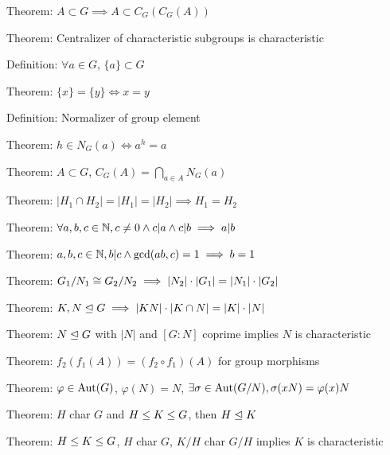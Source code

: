 \LA{}Theorem: $A\subset G\implies A\subset C_{G}(C_{G}(A))$~{\nwtagstyle{}}\RA{}

\LA{}Theorem: Centralizer of characteristic subgroups is characteristic~{\nwtagstyle{}}\RA{}

\LA{}Definition: $\forall a\in G$, $\{a\}\subset G$~{\nwtagstyle{}}\RA{}

\LA{}Theorem: $\{x\}=\{y\}\iff x=y$~{\nwtagstyle{}}\RA{}

\LA{}Definition: Normalizer of group element~{\nwtagstyle{}}\RA{}

\LA{}Theorem: $h\in N_{G}(a)\iff a^{h}=a$~{\nwtagstyle{}}\RA{}

\LA{}Theorem: $A\subset G$, $C_{G}(A) = \bigcap_{a\in A}N_{G}(a)$~{\nwtagstyle{}}\RA{}

\LA{}Theorem: $|H_{1}\cap H_{2}|=|H_{1}|=|H_{2}|\implies H_{1}=H_{2}$~{\nwtagstyle{}}\RA{}

\LA{}Theorem: $\forall a,b,c\in\mathbb{N}, c\neq0\land c|a\land c|b\implies a|b$~{\nwtagstyle{}}\RA{}

\LA{}Theorem: $a,b,c\in\mathbb{N}, b|c\land\gcd(ab,c)=1\implies b=1$~{\nwtagstyle{}}\RA{}

\LA{}Theorem: $G_{1}/N_{1}\cong G_{2}/N_{2}\implies |N_{2}|\cdot|G_{1}|=|N_{1}|\cdot|G_{2}|$~{\nwtagstyle{}}\RA{}

\LA{}Theorem: $K,N\trianglelefteq G\implies |KN|\cdot|K\cap N|=|K|\cdot|N|$~{\nwtagstyle{}}\RA{}

\LA{}Theorem: $N\trianglelefteq G$ with $|N|$ and $[G:N]$ coprime implies $N$ is characteristic~{\nwtagstyle{}}\RA{}

\LA{}Theorem: $f_{2}(f_{1}(A))=(f_{2}\circ f_{1})(A)$ for group morphisms~{\nwtagstyle{}}\RA{}

\LA{}Theorem: $\varphi\in\operatorname{Aut}(G)$, $\varphi(N)=N$, $\exists\sigma\in\operatorname{Aut}(G/N),\sigma(xN)=\varphi(x)N$~{\nwtagstyle{}}\RA{}

\LA{}Theorem: $H$ char $G$ and $H\leq K\leq G$, then $H\trianglelefteq K$~{\nwtagstyle{}}\RA{}

\LA{}Theorem: $H\leq K\leq G$, $H$ char $G$, $K/H$ char $G/H$ implies $K$ is characteristic~{\nwtagstyle{}}\RA{}


